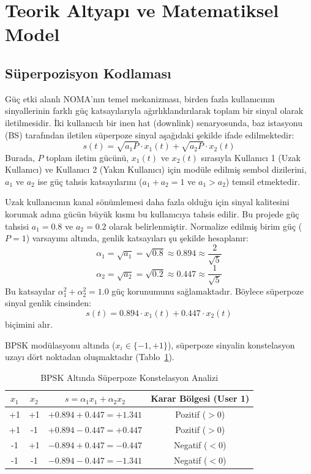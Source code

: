 \section{Teorik Altyapı ve Matematiksel Model}

\subsection{Süperpozisyon Kodlaması}
Güç etki alanlı NOMA'nın temel mekanizması, birden fazla kullanıcının sinyallerinin farklı güç katsayılarıyla ağırlıklandırılarak toplam bir sinyal olarak iletilmesidir. İki kullanıcılı bir inen hat (downlink) senaryosunda, baz istasyonu (BS) tarafından iletilen süperpoze sinyal aşağıdaki şekilde ifade edilmektedir:
\begin{equation}
s(t) = \sqrt{a_1 P} \cdot x_1(t) + \sqrt{a_2 P} \cdot x_2(t)
\end{equation}
Burada, $P$ toplam iletim gücünü, $x_1(t)$ ve $x_2(t)$ sırasıyla Kullanıcı 1 (Uzak Kullanıcı) ve Kullanıcı 2 (Yakın Kullanıcı) için modüle edilmiş sembol dizilerini, $a_1$ ve $a_2$ ise güç tahsis katsayılarını ($a_1 + a_2 = 1$ ve $a_1 > a_2$) temsil etmektedir.

Uzak kullanıcının kanal sönümlemesi daha fazla olduğu için sinyal kalitesini korumak adına gücün büyük kısmı bu kullanıcıya tahsis edilir. Bu projede güç tahsisi $a_1 = 0.8$ ve $a_2 = 0.2$ olarak belirlenmiştir. Normalize edilmiş birim güç ($P = 1$) varsayımı altında, genlik katsayıları şu şekilde hesaplanır:
\begin{equation}
\alpha_1 = \sqrt{a_1} = \sqrt{0.8} \approx 0.894 \approx \frac{2}{\sqrt{5}}
\end{equation}
\begin{equation}
\alpha_2 = \sqrt{a_2} = \sqrt{0.2} \approx 0.447 \approx \frac{1}{\sqrt{5}}
\end{equation}
Bu katsayılar $\alpha_1^2 + \alpha_2^2 = 1.0$ güç korunumunu sağlamaktadır. Böylece süperpoze sinyal genlik cinsinden:
\begin{equation}
s(t) = 0.894 \cdot x_1(t) + 0.447 \cdot x_2(t)
\end{equation}
biçimini alır.

BPSK modülasyonu altında ($x_i \in \{-1, +1\}$), süperpoze sinyalin konstelasyon uzayı dört noktadan oluşmaktadır (Tablo~\ref{tab:constellation_analysis}).

\begin{table}[htbp]
\caption{BPSK Altında Süperpoze Konstelasyon Analizi}
\label{tab:constellation_analysis}
\centering
\begin{tabular}{cccc}
\toprule
$x_1$ & $x_2$ & $s = \alpha_1 x_1 + \alpha_2 x_2$ & Karar Bölgesi (User 1) \\
\midrule
+1 & +1 & $+0.894 + 0.447 = +1.341$ & Pozitif ($>0$) \\
+1 & -1 & $+0.894 - 0.447 = +0.447$ & Pozitif ($>0$) \\
-1 & +1 & $-0.894 + 0.447 = -0.447$ & Negatif ($<0$) \\
-1 & -1 & $-0.894 - 0.447 = -1.341$ & Negatif ($<0$) \\
\bottomrule
\end{tabular}
\end{table}

